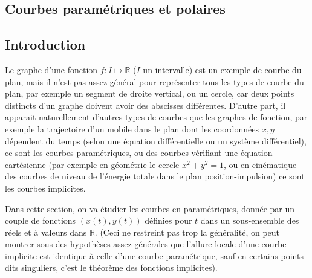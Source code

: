 \documentclass[a4paper,11pt]{article}
\newcommand{\R}{{\mathbb{R}}}
\begin{document}
\begin{giacjshere}
\section{Courbes param\'etriques et polaires} \label{sec:courbes}

\subsection{Introduction}
Le graphe d'une fonction $f: I \mapsto \R$ ($I$ un intervalle)
est un exemple de courbe du plan, mais il
n'est pas assez g\'en\'eral pour repr\'esenter tous les types de
courbe du plan, par exemple un segment de droite vertical, ou
un cercle, car deux points distincts d'un graphe doivent avoir
des abscisses diff\'erentes. D'autre part, il apparait naturellement
d'autres types de courbes que les graphes de fonction, par exemple
la trajectoire d'un mobile dans le plan dont les coordonn\'ees $x,y$
d\'ependent du temps (selon une \'equation diff\'erentielle ou
un syst\`eme diff\'erentiel), ce sont les courbes param\'etriques,
ou des courbes v\'erifiant une
\'equation cart\'esienne (par exemple en g\'eom\'etrie
le cercle $x^2+y^2=1$, ou en cin\'ematique des courbes
de niveau de l'\'energie totale dans le plan position-impulsion)
ce sont les courbes implicites.

Dans cette section, on va \'etudier les courbes en param\'etriques,
donn\'ee par un couple de fonctions $(x(t),y(t))$ d\'efinies 
pour $t$ dans un sous-ensemble des r\'eels et \`a valeurs dans $\R$.
(Ceci ne restreint pas trop la g\'en\'eralit\'e,
on peut montrer sous des hypoth\`eses assez g\'en\'erales 
que l'allure locale d'une courbe implicite est identique \`a celle
d'une courbe param\'etrique, sauf en certains points dits singuliers,
c'est le th\'eor\`eme des fonctions implicites).


\end{giacjshere}
\end{document}
